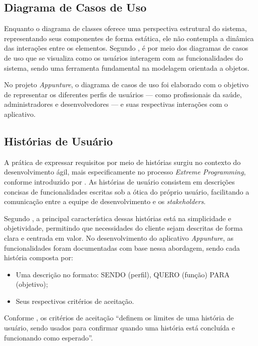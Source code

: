 \subsection{Diagrama de Casos de Uso}

Enquanto o diagrama de classes oferece uma perspectiva estrutural do sistema, representando seus componentes de forma estática, ele não contempla a dinâmica das interações entre os elementos. Segundo , é por meio dos diagramas de casos de uso que se visualiza como os usuários interagem com as funcionalidades do sistema, sendo uma ferramenta fundamental na modelagem orientada a objetos.

No projeto \textit{Appunture}, o diagrama de casos de uso foi elaborado com o objetivo de representar os diferentes perfis de usuários --- como profissionais da saúde, administradores e desenvolvedores --- e suas respectivas interações com o aplicativo.

\subsection{Histórias de Usuário}

A prática de expressar requisitos por meio de histórias surgiu no contexto do desenvolvimento ágil, mais especificamente no processo \textit{Extreme Programming}, conforme introduzido por . As histórias de usuário consistem em descrições concisas de funcionalidades escritas sob a ótica do próprio usuário, facilitando a comunicação entre a equipe de desenvolvimento e os \textit{stakeholders}.

Segundo , a principal característica dessas histórias está na simplicidade e objetividade, permitindo que necessidades do cliente sejam descritas de forma clara e centrada em valor. No desenvolvimento do aplicativo \textit{Appunture}, as funcionalidades foram documentadas com base nessa abordagem, sendo cada história composta por:

\begin{itemize}
    \item Uma descrição no formato: SENDO (perfil), QUERO (função) PARA (objetivo);
    \item Seus respectivos critérios de aceitação.
\end{itemize}

Conforme , os critérios de aceitação ``definem os limites de uma história de usuário, sendo usados para confirmar quando uma história está concluída e funcionando como esperado''.

